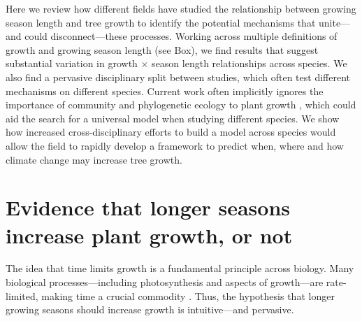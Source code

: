 \documentclass[11pt]{article}
\newcommand{\R}[1]{\label{#1}\linelabel{#1}}
\begin{document}
Here we review how different fields have studied the relationship between growing season length and tree growth to identify the potential mechanisms that unite---and could disconnect---these processes. %
Working across multiple definitions of growth and growing season length (see Box),\R{R1growth} we find results that suggest substantial variation in growth $\times$ season length relationships across species. We also find a pervasive disciplinary split between studies, which often test different mechanisms on different species. Current work often implicitly ignores the importance of community and phylogenetic ecology to plant growth \citep[e.g.][]{Grime:1977sw,Webb:2002or,avila2023evidence}, which could aid the search for a universal model when studying different species. We show how increased cross-disciplinary efforts to build a model across species would allow the field to rapidly develop a framework to predict when, where and how climate change may increase tree growth. %

\section*{Evidence that longer seasons increase plant growth, or not}
The idea that time limits growth is a fundamental principle across biology. Many biological processes---including photosynthesis and aspects of growth---are rate-limited, making time a crucial commodity \citep{nobel1983biophysical,cosgrove2005growth,hilty2021plant}. Thus, the hypothesis that longer growing seasons should increase growth is intuitive---and pervasive. 
\end{document}

